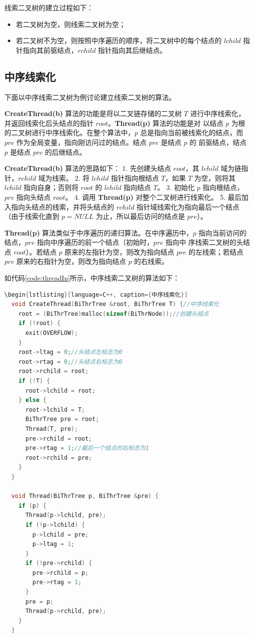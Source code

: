 \documentclass[lang=cn,newtx,10pt,scheme=chinese]{elegantbook}
\begin{document}
线索二叉树的建立过程如下：

\begin{itemize}
  \item 若二叉树为空，则线索二叉树为空；
  \item 若二叉树不为空，则按照中序遍历的顺序，将二叉树中的每个结点的 $lchild$ 指针指向其前驱结点，$rchild$ 指针指向其后继结点。
  \end{itemize}

\subsection{中序线索化}

下面以中序线索二叉树为例讨论建立线索二叉树的算法。

\textbf{CreateThread(b)} 算法的功能是将以二叉链存储的二叉树 $T$ 进行中序线索化，并返回线索化后头结点的指针 $root$。\textbf{Thread(p)} 算法的功能是对
以结点 $p$ 为根的二叉树进行中序线索化。在整个算法中，$p$ 总是指向当前被线索化的结点，而 $pre$ 作为全局变量，指向刚访问过的结点。结点 $pre$ 是结点 $p$ 的
前驱结点，结点 $p$ 是结点 $pre$ 的后继结点。

\textbf{CreateThread(b)} 算法的思路如下：
1. 先创建头结点 $root$，其 $lchild$ 域为链指针，$rchild$ 域为线索。
2. 将 $lchild$ 指针指向根结点 $T$，如果 $T$ 为空，则将其 $lchild$ 指向自身；否则将 $root$ 的 $lchild$ 指向结点 $T$。
3. 初始化 $p$ 指向根结点，$pre$ 指向头结点 $root$。
4. 调用 \textbf{Thread(p)} 对整个二叉树进行线索化。
5. 最后加入指向头结点的线索，并将头结点的 $rchild$ 指针域线索化为指向最后一个结点（由于线索化直到 $p = NULL$ 为止，所以最后访问的结点是 $pre$）。

\textbf{Thread(p)} 算法类似于中序遍历的递归算法。在中序遍历中，$p$ 指向当前访问的结点，$pre$ 指向中序遍历的前一个结点（初始时，$pre$ 指向中
序线索二叉树的头结点 $root$）。若结点 $p$ 原来的左指针为空，则改为指向结点 $pre$ 的左线索；若结点 $pre$ 原来的右指针为空，则改为指向结点 $p$ 的右线索。

如代码\ref{code:threadIn}所示，中序线索二叉树的算法如下：

\begin{lstlisting}[language=C++, caption={中序线索化}, label={code:threadIn}]
  \begin{lstlisting}[language=C++, caption={中序线索化}]
  void CreateThread(BiThrTree &root, BiThrTree T) {//中序线索化
    root = (BiThrTree)malloc(sizeof(BiThrNode));//创建头结点
    if (!root) {
      exit(OVERFLOW);
    }
    root->ltag = 0;//头结点左标志为0
    root->rtag = 0;//头结点右标志为0
    root->rchild = root;
    if (!T) {
      root->lchild = root;
    } else {
      root->lchild = T;
      BiThrTree pre = root;
      Thread(T, pre);
      pre->rchild = root;
      pre->rtag = 1;//最后一个结点的右标志为1
      root->rchild = pre;
    }
  }
  
  void Thread(BiThrTree p, BiThrTree &pre) {
    if (p) {
      Thread(p->lchild, pre);
      if (!p->lchild) {
        p->lchild = pre;
        p->ltag = 1;
      }
      if (!pre->rchild) {
        pre->rchild = p;
        pre->rtag = 1;
      }
      pre = p;
      Thread(p->rchild, pre);
    }
  }
  \end{lstlisting}
\end{document}
